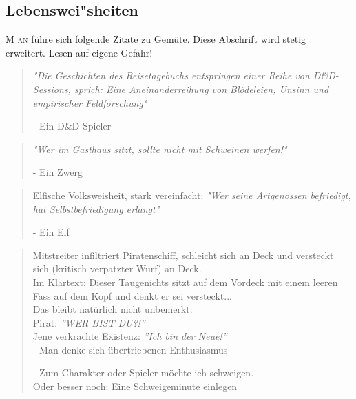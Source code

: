 \documentclass[11pt, openany]{article} %
\begin{document}
\newpage

\subsection{Lebenswei"sheiten}

\lettrine{M}{ an} f\"uhre sich folgende Zitate zu Gem\"ute. Diese Abschrift wird stetig\\ erweitert. Lesen auf eigene Gefahr!

\begin{quote}
    \textit{"Die Geschichten des Reisetagebuchs entspringen einer Reihe von D\&D-Sessions, sprich: Eine Aneinanderreihung von Bl\"odeleien, Unsinn und empirischer Feldforschung"}
    \begin{flushright}
        - Ein D\&D-Spieler
    \end{flushright}
\end{quote}

\begin{quote}
    \textit{"Wer im Gasthaus sitzt, sollte nicht mit Schweinen werfen!"}
    \begin{flushright}
        - Ein Zwerg
    \end{flushright}
\end{quote}

\begin{quote}
    Elfische Volksweisheit, stark vereinfacht: \textit{"Wer seine Artgenossen befriedigt, hat Selbstbefriedigung erlangt"}
    \begin{flushright}
        - Ein Elf
    \end{flushright}
\end{quote}

\begin{quote}
    Mitstreiter infiltriert Piratenschiff, schleicht sich an Deck und versteckt sich (kritisch verpatzter Wurf) an Deck.\\ Im Klartext: Dieser Taugenichts sitzt auf dem Vordeck mit einem leeren Fass auf dem Kopf und denkt er sei versteckt...\\ Das bleibt nat\"urlich nicht unbemerkt:\\
    Pirat: \textit{''WER BIST DU?!''}\\
    Jene verkrachte Existenz: \textit{''Ich bin der Neue!''}\\ - Man denke sich \"ubertriebenen Enthusiasmus -
    \begin{flushright}
        - Zum Charakter oder Spieler m\"ochte ich schweigen.\\
        Oder besser noch: Eine Schweigeminute einlegen
    \end{flushright}
\end{quote}
\end{document}
